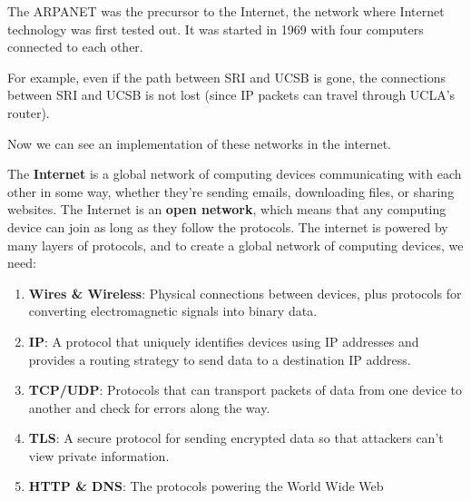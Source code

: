 \documentclass{article}
\begin{document}
    \begin{example}[ARPANET]
      The ARPANET was the precursor to the Internet, the network where Internet technology was first tested out. It was started in 1969 with four computers connected to each other. 

        \begin{center}
        \end{center}

      For example, even if the path between SRI and UCSB is gone, the connections between SRI and UCSB is not lost (since IP packets can travel through UCLA's router). 
    \end{example}


    Now we can see an implementation of these networks in the internet. 

    \begin{definition}[Internet]
      The \textbf{Internet} is a global network of computing devices communicating with each other in some way, whether they're sending emails, downloading files, or sharing websites. The Internet is an \textbf{open network}, which means that any computing device can join as long as they follow the protocols. The internet is powered by many layers of protocols, and to create a global network of computing devices, we need: 

      \begin{enumerate}
        \item \textbf{Wires \& Wireless}: Physical connections between devices, plus protocols for converting electromagnetic signals into binary data. 
        \item \textbf{IP}: A protocol that uniquely identifies devices using IP addresses and provides a routing strategy to send data to a destination IP address. 
        \item \textbf{TCP/UDP}: Protocols that can transport packets of data from one device to another and check for errors along the way. 
        \item \textbf{TLS}: A secure protocol for sending encrypted data so that attackers can't view private information. 
        \item \textbf{HTTP \& DNS}: The protocols powering the World Wide Web
      \end{enumerate}        
    \end{definition}
\end{document}
